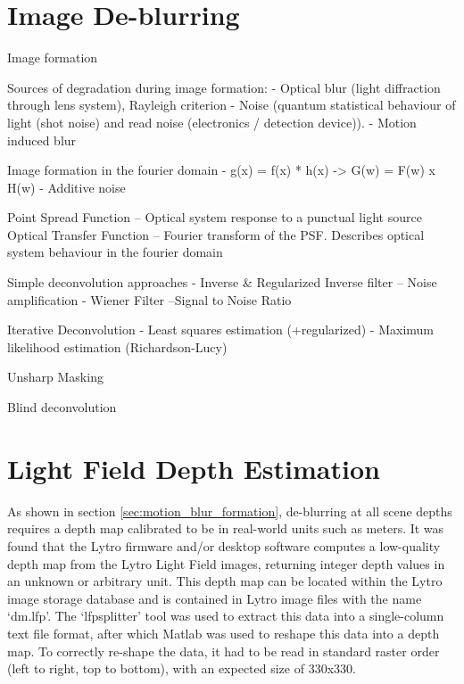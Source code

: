 \section{Image De-blurring}
\label{sec:image_deblurring}

Image formation

Sources of degradation during image formation:
 - Optical blur (light diffraction through lens system), Rayleigh criterion
 - Noise (quantum statistical behaviour of light (shot noise) and read noise (electronics / detection device)).
 - Motion induced blur

Image formation in the fourier domain
 - g(x) = f(x) * h(x) -> G(w) = F(w) x H(w)
 - Additive noise

Point Spread Function – Optical system response to a punctual light source
Optical Transfer Function – Fourier transform of the PSF. Describes optical system behaviour in the fourier domain

Simple deconvolution approaches
 - Inverse \& Regularized Inverse filter
 -- Noise amplification
 - Wiener Filter
 --Signal to Noise Ratio

Iterative Deconvolution
 - Least squares estimation (+regularized)
 - Maximum likelihood estimation (Richardson-Lucy)

Unsharp Masking

Blind deconvolution


\section{Light Field Depth Estimation}
\label{sec:light_field_depth_estimation}

As shown in section \ref{sec:motion_blur_formation}, de-blurring at all scene depths requires a depth map calibrated to be in real-world units such as meters.
It was found that the Lytro firmware and/or desktop software computes a low-quality depth map from the Lytro Light Field images, returning integer depth values in an unknown or arbitrary unit.
This depth map can be located within the Lytro image storage database and is contained in Lytro image files with the name \enquote*{dm.lfp}.
The \enquote*{lfpsplitter} tool \cite{patel2013lfptools} was used to extract this data into a single-column text file format, after which Matlab was used to reshape this data into a depth map.
To correctly re-shape the data, it had to be read in standard raster order (left to right, top to bottom), with an expected size of 330x330.

